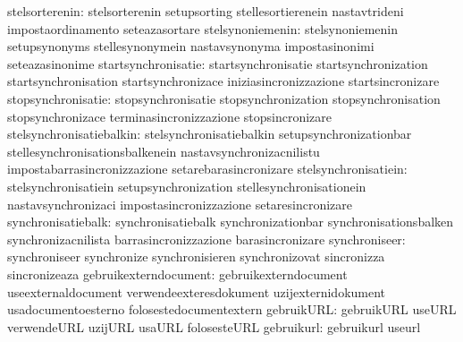                   stelsorterenin: stelsorterenin                   setupsorting
                                  stellesortierenein               nastavtrideni
                                  impostaordinamento               seteazasortare
                stelsynoniemenin: stelsynoniemenin                 setupsynonyms
                                  stellesynonymein                 nastavsynonyma
                                  impostasinonimi                  seteazasinonime
             startsynchronisatie: startsynchronisatie              startsynchronization
                                  startsynchronisation             startsynchronizace
                                  iniziasincronizzazione           startsincronizare
              stopsynchronisatie: stopsynchronisatie               stopsynchronization
                                  stopsynchronisation              stopsynchronizace
                                  terminasincronizzazione          stopsincronizare
        stelsynchronisatiebalkin: stelsynchronisatiebalkin         setupsynchronizationbar
                                  stellesynchronisationsbalkenein  nastavsynchronizacnilistu
                                  impostabarrasincronizzazione     setarebarasincronizare
            stelsynchronisatiein: stelsynchronisatiein             setupsynchronization
                                  stellesynchronisationein         nastavsynchronizaci
                                  impostasincronizzazione          setaresincronizare
              synchronisatiebalk: synchronisatiebalk               synchronizationbar
                                  synchronisationsbalken           synchronizacnilista
                                  barrasincronizzazione            barasincronizare
                   synchroniseer: synchroniseer                    synchronize
                                  synchronisieren                  synchronizovat
                                  sincronizza                      sincronizeaza
           gebruikexterndocument: gebruikexterndocument            useexternaldocument
                                  verwendeexteresdokument          uzijexternidokument
                                  usadocumentoesterno              folosestedocumentextern
                      gebruikURL: gebruikURL                       useURL
                                  verwendeURL                      uzijURL
                                  usaURL                           folosesteURL
                      gebruikurl: gebruikurl                       useurl

